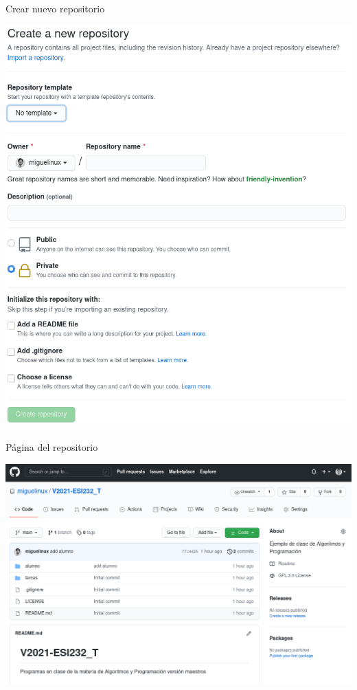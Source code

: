 \begin{frame}[c]{Crear nuevo repositorio}
    \begin{center}
        \includegraphics[scale=0.24]{img/github-new-repo.png}
    \end{center}
\end{frame}

\begin{frame}[c]{Página del repositorio}
    \begin{center}
        \includegraphics[scale=0.3]{img/github-repo.png}
    \end{center}
\end{frame}

